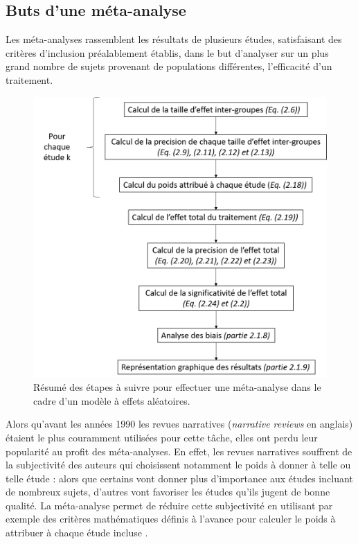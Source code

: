 \subsection{Buts d'une méta-analyse}

Les méta-analyses rassemblent les résultats de plusieurs études, satisfaisant des critères d'inclusion préalablement établis, dans le but d'analyser
sur un plus grand nombre de sujets provenant de populations différentes, l'efficacité d'un traitement. 

\begin{figure}[h!]
  \centering
	\includegraphics[width=1.0\linewidth]{figures/chapter-2/pipeline-perform-meta-analysis} 
  \caption{Résumé des étapes à suivre pour effectuer une méta-analyse dans le cadre d'un modèle à effets aléatoires.}
  \label{Figure:pipeline_meta_analyse}
\end{figure}

Alors qu'avant les années 1990 les revues narratives (\textit{narrative reviews} en anglais) étaient le plus couramment utilisées pour cette tâche, elles ont 
perdu leur popularité au profit des méta-analyses. En effet, les revues narratives souffrent de la subjectivité des auteurs qui choisissent notamment le poids 
à donner à telle ou telle étude : alors que certains
vont donner plus d'importance aux études incluant de nombreux sujets, d'autres vont favoriser les études qu'ils jugent de bonne qualité. La méta-analyse permet 
de réduire cette subjectivité en utilisant par exemple des critères mathématiques définis à l'avance pour calculer le poids à attribuer à chaque étude incluse
\citep{Borenstein2009}. 

